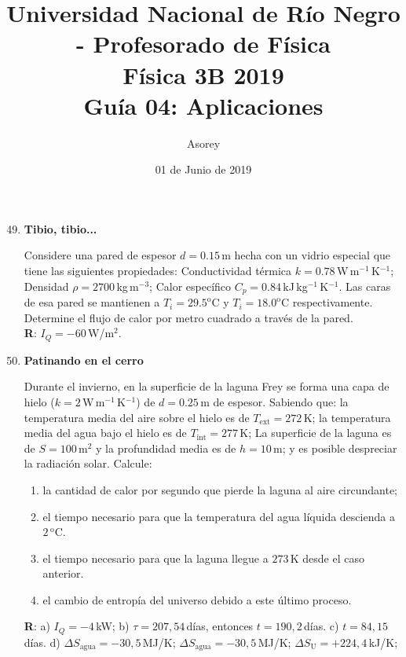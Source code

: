 \documentclass[a4paper,12pt]{article}
\begin{document}
\title{
{\normalsize{Universidad Nacional de Río Negro - Profesorado de Física}}\\
Física 3B 2019 \\ Guía 04: Aplicaciones
}
\author{Asorey}
\date{01 de Junio de 2019}
\maketitle

\begin{enumerate}
	\setcounter{enumi}{48}     

	\item{\bf{Tibio, tibio...}}

		Considere una pared de espesor $d=0.15$\,m hecha con un vidrio especial
		que tiene las siguientes propiedades: Conductividad térmica
		$k=0.78$\,W\,m$^{-1}$\,K$^{-1}$; Densidad $\rho = 2700$\,kg\,m$^{-3}$;
		Calor específico $C_p = 0.84$\,kJ\,kg$^{-1}$\,K$^{-1}$.  Las caras de
		esa pared se mantienen a $T_i=29.5^\mathrm{o}$C y
		$T_i=18.0^\mathrm{o}$C respectivamente. Determine el flujo de calor por
		metro cuadrado a través de la pared.
		\\{\bf{R}}: $I_Q=-60$\,W/m$^2$.
	
	\item{\bf{Patinando en el cerro}}
		
		Durante el invierno, en la superficie de la laguna Frey se forma una
		capa de hielo ($k=2$\,W\,m$^{-1}$\,K$^{-1}$) de $d=0.25$\,m de espesor.
		Sabiendo que: la temperatura media del aire sobre el hielo es de
		$T_\mathrm{ext}=272$\,K; la temperatura media del agua bajo el hielo es
		de $T_\mathrm{int}=277$\,K; La superficie de la laguna es de
		$S=100$\,m$^2$ y la profundidad media es de $h=10$\,m; y es posible
		despreciar la radiación solar. Calcule:
		\begin{enumerate}
			\item la cantidad de calor por segundo que pierde la laguna al
				aire circundante;
			\item el tiempo necesario para que la temperatura del agua líquida
				descienda a $2$\,$^\mathrm{o}$C.
			\item el tiempo necesario para que la laguna llegue a $273$\,K
				desde el caso anterior.
			\item el cambio de entropía del universo debido a este último proceso.
		\end{enumerate}
		{\bf{R}}: a) $I_Q=-4$\,kW; b) $\tau=207,54$\,días, entonces
		$t=190,2$\,días. c) $t=84,15$\,días. d) $\Delta
		S_{\mathrm{agua}}=-30,5$\,MJ/K; $\Delta S_{\mathrm{agua}}=-30,5$\,MJ/K;
		$\Delta S_{\mathrm{U}}=+224,4$\,kJ/K;
		

\end{enumerate}
\end{document}
